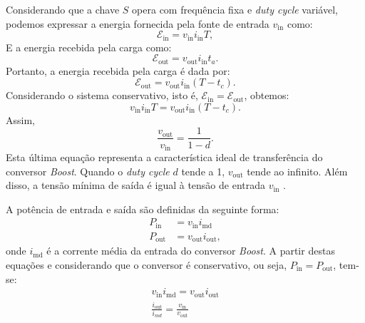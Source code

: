 Considerando que a chave $S$ opera com frequência fixa e \textit{duty cycle }variável, podemos expressar a energia fornecida pela fonte de entrada $v_{\mathrm{in}}$ como: \begin{equation} \mathcal{E}_{\mathrm{in}} = v_{\mathrm{in}} i_{\mathrm{in}} T, \end{equation} E a energia recebida pela carga como: \begin{equation} \mathcal{E}_{\mathrm{out}} = v_{\mathrm{out}} i_{\mathrm{in}} t_a. \end{equation} Portanto, a energia recebida pela carga é dada por: \begin{equation} \mathcal{E}_{\mathrm{out}} = v_{\mathrm{out}} i_{\mathrm{in}} (T - t_c). \end{equation} Considerando o sistema conservativo, isto é, $\mathcal{E}_{\mathrm{in}} = \mathcal{E}_{\mathrm{out}}$, obtemos: \begin{equation} v_{\mathrm{in}} i_{\mathrm{in}} T = v_{\mathrm{out}} i_{\mathrm{in}} (T - t_c). \end{equation} Assim, \begin{equation} \frac{v_{\mathrm{out}}}{v_{\mathrm{in}}} = \frac{1}{1-d} \label{eq:ideal_feature_boost}.\end{equation} Esta última equação representa a característica ideal de transferência do conversor \textit{Boost}. Quando o \textit{duty cycle }$d$ tende a 1, $v_{\mathrm{out}}$ tende ao infinito. Além disso, a tensão mínima de saída é igual à tensão de entrada $v_{\mathrm{in}}$ \citep{martins2008}.

A potência de entrada e saída são definidas da seguinte forma: \begin{align} P_{\mathrm{in}} &= v_{\mathrm{in}}  i_{\mathrm{md}} \\ P_{\mathrm{out}} &= v_{\mathrm{out}} i_{\mathrm{out}}, \end{align} onde $i_{\mathrm{md}}$ é a corrente média da entrada do conversor \textit{Boost}. A partir destas equações e considerando que o conversor é conservativo, ou seja, $P_{\mathrm{in}} = P_{\mathrm{out}}$, tem-se: \begin{gather} v_{\mathrm{in}} i_{\mathrm{md}} = v_{\mathrm{out}}i_{\mathrm{out}} \\ \frac{i_{\mathrm{out}}}{i_{md}} = \frac{v_{\mathrm{in}}}{v_{\mathrm{out}}} \label{eq:boost_converter_iv} \end{gather}

